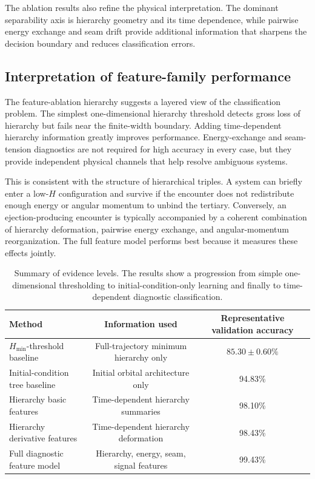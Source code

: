 \documentclass[12pt,a4paper]{article}
\newcommand{\Hmin}{H_{\min}}
\begin{document}
The ablation results also refine the physical interpretation. The dominant separability axis is hierarchy geometry and its time dependence, while pairwise energy exchange and seam drift provide additional information that sharpens the decision boundary and reduces classification errors.

\subsection{Interpretation of feature-family performance}
\label{sec:feature_family_interpretation}

The feature-ablation hierarchy suggests a layered view of the classification problem. The simplest one-dimensional hierarchy threshold detects gross loss of hierarchy but fails near the finite-width boundary. Adding time-dependent hierarchy information greatly improves performance. Energy-exchange and seam-tension diagnostics are not required for high accuracy in every case, but they provide independent physical channels that help resolve ambiguous systems.

This is consistent with the structure of hierarchical triples. A system can briefly enter a low-\(H\) configuration and survive if the encounter does not redistribute enough energy or angular momentum to unbind the tertiary. Conversely, an ejection-producing encounter is typically accompanied by a coherent combination of hierarchy deformation, pairwise energy exchange, and angular-momentum reorganization. The full feature model performs best because it measures these effects jointly.

\begin{table}[H]
\centering
\caption{Summary of evidence levels. The results show a progression from simple one-dimensional thresholding to initial-condition-only learning and finally to time-dependent diagnostic classification.}
\label{tab:evidence_ladder}
\begin{tabular}{lcc}
\toprule
Method & Information used & Representative validation accuracy \\
\midrule
\(\Hmin\)-threshold baseline & Full-trajectory minimum hierarchy only & \(85.30\pm0.60\%\) \\
Initial-condition tree baseline & Initial orbital architecture only & 94.83\% \\
Hierarchy basic features & Time-dependent hierarchy summaries & 98.10\% \\
Hierarchy derivative features & Time-dependent hierarchy deformation & 98.43\% \\
Full diagnostic feature model & Hierarchy, energy, seam, signal features & 99.43\% \\
\bottomrule
\end{tabular}
\end{table}
\end{document}
